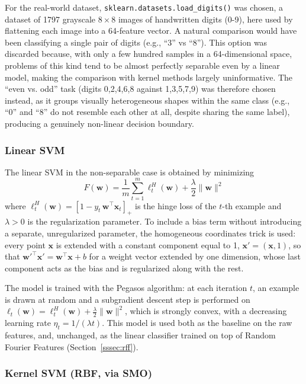 \documentclass{article}
\begin{document}
For the real-world dataset, \texttt{sklearn.datasets.load\_digits()} was chosen, a dataset of 1797 grayscale $8\times 8$ images of handwritten digits (0-9), here used by flattening each image into a 64-feature vector. A natural comparison would have been classifying a single pair of digits (e.g., ``3'' vs ``8''). This option was discarded because, with only a few hundred samples in a 64-dimensional space, problems of this kind tend to be almost perfectly separable even by a linear model, making the comparison with kernel methods largely uninformative. The ``even vs. odd'' task (digits 0,2,4,6,8 against 1,3,5,7,9) was therefore chosen instead, as it groups visually heterogeneous shapes within the same class (e.g., ``0'' and ``8'' do not resemble each other at all, despite sharing the same label), producing a genuinely non-linear decision boundary.

\subsubsection{Linear SVM}

The linear SVM in the non-separable case is obtained by minimizing
\begin{equation}
    F(\mathbf{w}) = \frac{1}{m}\sum_{t=1}^m \ell^H_t(\mathbf{w}) + \frac{\lambda}{2}\|\mathbf{w}\|^2
\end{equation}
where $\ell^H_t(\mathbf{w}) = \left[1 - y_t\, \mathbf{w}^\top\mathbf{x}_t\right]_+$ is the hinge loss of the $t$-th example and $\lambda > 0$ is the regularization parameter. To include a bias term without introducing a separate, unregularized parameter, the homogeneous coordinates trick is used: every point $\mathbf{x}$ is extended with a constant component equal to 1, $\mathbf{x}' = (\mathbf{x}, 1)$, so that $\mathbf{w}'^\top\mathbf{x}' = \mathbf{w}^\top\mathbf{x} + b$ for a weight vector extended by one dimension, whose last component acts as the bias and is regularized along with the rest.

The model is trained with the Pegasos algorithm: at each iteration $t$, an example is drawn at random and a subgradient descent step is performed on $\ell_t(\mathbf{w}) = \ell^H_t(\mathbf{w}) + \frac{\lambda}{2}\|\mathbf{w}\|^2$, which is strongly convex, with a decreasing learning rate $\eta_t = 1/(\lambda t)$. This model is used both as the baseline on the raw features, and, unchanged, as the linear classifier trained on top of Random Fourier Features (Section~\ref{sssec:rff}).

\subsubsection{Kernel SVM (RBF, via SMO)}
\end{document}
